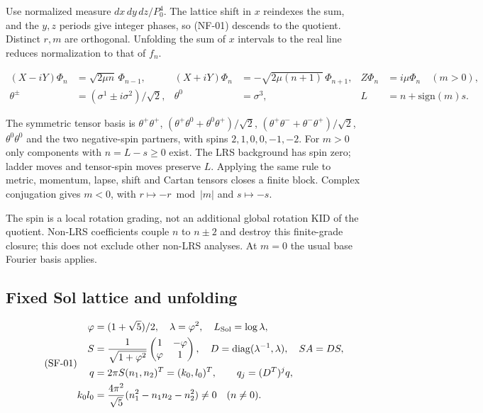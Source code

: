 Use normalized measure $dx\,dy\,dz/P_0^4$. The lattice shift in $x$ reindexes the sum, and the $y,z$ periods give integer phases, so (NF-01) descends to the quotient. Distinct $r,m$ are orthogonal. Unfolding the sum of $x$ intervals to the real line reduces normalization to that of $f_n$.

\begin{equation}\tag{NF-02}\label{eq:NF-02}
\begin{aligned}
(X-iY)\Phi_n&=\sqrt{2\mu n}\,\Phi_{n-1},&
(X+iY)\Phi_n&=-\sqrt{2\mu(n+1)}\,\Phi_{n+1},&Z\Phi_n&=i\mu\Phi_n\quad(m>0),\\
\theta^\pm&=(\sigma^1\pm i\sigma^2)/\sqrt2,&\theta^0&=\sigma^3,& L&=n+\mathrm{sign}(m)s.
\end{aligned}
\end{equation}

The symmetric tensor basis is $\theta^+\theta^+$, $(\theta^+\theta^0+\theta^0\theta^+)/\sqrt2$, $(\theta^+\theta^-+\theta^-\theta^+)/\sqrt2$, $\theta^0\theta^0$ and the two negative-spin partners, with spins $2,1,0,0,-1,-2$. For $m>0$ only components with $n=L-s\ge0$ exist. The LRS background has spin zero; ladder moves and tensor-spin moves preserve $L$. Applying the same rule to metric, momentum, lapse, shift and Cartan tensors closes a finite block. Complex conjugation gives $m<0$, with $r\mapsto-r\bmod|m|$ and $s\mapsto-s$.

The spin is a local rotation grading, not an additional global rotation KID of the quotient. Non-LRS coefficients couple $n$ to $n\pm2$ and destroy this finite-grade closure; this does not exclude other non-LRS analyses. At $m=0$ the usual base Fourier basis applies.

\subsection{Fixed Sol lattice and unfolding}

\begin{equation}\tag{SF-01}\label{eq:SF-01}
\begin{aligned}
\varphi&=(1+\sqrt5)/2,\quad\lambda=\varphi^2,\quad L_{\rm Sol}=\log\lambda,\\
S&=\frac1{\sqrt{1+\varphi^2}}\begin{pmatrix}1&-\varphi\\\varphi&1\end{pmatrix},\quad
D=\mathrm{diag}(\lambda^{-1},\lambda),\quad SA=DS,\\
q&=2\pi S(n_1,n_2)^T=(k_0,l_0)^T,\qquad q_j=(D^T)^jq,\\
k_0l_0&=\frac{4\pi^2}{\sqrt5}(n_1^2-n_1n_2-n_2^2)\ne0\quad(n\ne0).
\end{aligned}
\end{equation}

